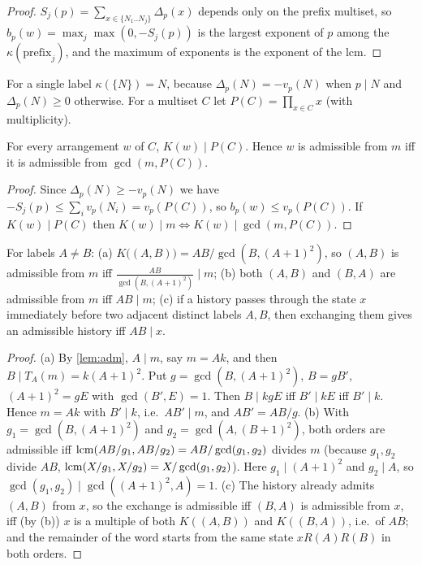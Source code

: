 \begin{proof}
$S_j(p)=\sum_{x\in\{N_1..N_j\}}\Delta_p(x)$ depends only on the prefix multiset, so $b_p(w)=\max_j\max(0,-S_j(p))$ is the largest exponent of $p$ among the $\kappa(\text{prefix}_j)$, and the maximum of exponents is the exponent of the lcm.
\end{proof}
For a single label $\kappa(\{N\})=N$, because $\Delta_p(N)=-v_p(N)$ when $p\mid N$ and $\Delta_p(N)\ge0$ otherwise. For a multiset $C$ let $P(C)=\prod_{x\in C}x$ (with multiplicity).
\begin{corollary}\label{cor:G}
For every arrangement $w$ of $C$, $K(w)\mid P(C)$. Hence $w$ is admissible from $m$ iff it is admissible from $\gcd(m,P(C))$.
\end{corollary}
\begin{proof}
Since $\Delta_p(N)\ge-v_p(N)$ we have $-S_j(p)\le\sum_iv_p(N_i)=v_p(P(C))$, so $b_p(w)\le v_p(P(C))$. If $K(w)\mid P(C)$ then $K(w)\mid m\iff K(w)\mid\gcd(m,P(C))$.
\end{proof}
\begin{proposition}\label{prop:diamond}
For labels $A\ne B$: (a) $K\bigl((A,B)\bigr)=AB/\gcd(B,(A+1)^2)$, so $(A,B)$ is admissible from $m$ iff $\frac{AB}{\gcd(B,(A+1)^2)}\mid m$; (b) both $(A,B)$ and $(B,A)$ are admissible from $m$ iff $AB\mid m$; (c) if a history passes through the state $x$ immediately before two adjacent distinct labels $A,B$, then exchanging them gives an admissible history iff $AB\mid x$.
\end{proposition}
\begin{proof}
(a) By \cref{lem:adm}, $A\mid m$, say $m=Ak$, and then $B\mid T_A(m)=k(A+1)^2$. Put $g=\gcd(B,(A+1)^2)$, $B=gB'$, $(A+1)^2=gE$ with $\gcd(B',E)=1$. Then $B\mid kgE$ iff $B'\mid kE$ iff $B'\mid k$. Hence $m=Ak$ with $B'\mid k$, i.e.\ $AB'\mid m$, and $AB'=AB/g$. (b) With $g_1=\gcd(B,(A+1)^2)$ and $g_2=\gcd(A,(B+1)^2)$, both orders are admissible iff $\operatorname{lcm}(AB/g_1,AB/g_2)=AB/\gcd(g_1,g_2)$ divides $m$ (because $g_1,g_2$ divide $AB$, $\operatorname{lcm}(X/g_1,X/g_2)=X/\gcd(g_1,g_2)$). Here $g_1\mid(A+1)^2$ and $g_2\mid A$, so $\gcd(g_1,g_2)\mid\gcd((A+1)^2,A)=1$. (c) The history already admits $(A,B)$ from $x$, so the exchange is admissible iff $(B,A)$ is admissible from $x$, iff (by (b)) $x$ is a multiple of both $K((A,B))$ and $K((B,A))$, i.e.\ of $AB$; and the remainder of the word starts from the same state $xR(A)R(B)$ in both orders.
\end{proof}
